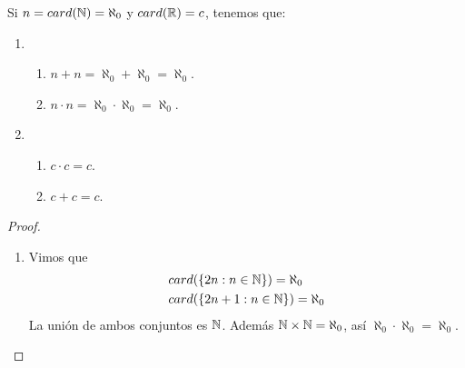 \begin{eg}
  Si \(n = card(\mathbb{N}) = \aleph_0\) y \(card(\mathbb{R}) = c\), tenemos que:
  \begin{enumerate}
    \item \begin{enumerate}
            \item \(n+n = \aleph_0 + \aleph_0 = \aleph_0\).
            \item \(n \cdot n = \aleph_0 \cdot \aleph_0 = \aleph_0\).
          \end{enumerate}
    \item \begin{enumerate}
            \item \(c \cdot c = c\).
            \item \(c+c = c\).
          \end{enumerate}
  \end{enumerate}

  \begin{proof}
    \begin{enumerate}
      \item Vimos que \begin{align*}
               & card(\{ 2n : n \in \mathbb{N} \}) = \aleph_0   \\
               & card(\{ 2n+1 : n \in \mathbb{N} \}) = \aleph_0
            \end{align*} 
      La unión de ambos conjuntos es \(\mathbb{N} \). Además \(\mathbb{N} \times \mathbb{N} = \aleph_0\), así \(\aleph_0 \cdot \aleph_0 = \aleph_0\).


\end{enumerate}
\end{proof}
\end{eg}
